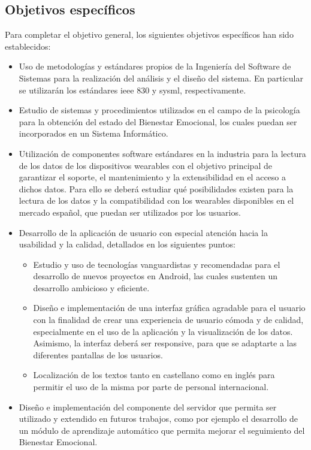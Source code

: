     \subsection{Objetivos específicos}
        Para completar el objetivo general, los siguientes objetivos específicos han sido establecidos:
        \begin{itemize}
            \item Uso de metodologías y estándares propios de la Ingeniería del Software de Sistemas para la realización del análisis y el diseño del sistema. En particular se utilizarán los estándares \gls{ieee} 830 y \gls{sysml}, respectivamente.
            \item Estudio de sistemas y procedimientos utilizados en el campo de la psicología para la obtención del estado del Bienestar Emocional, los cuales puedan ser incorporados en un Sistema Informático.
            \item Utilización de componentes software estándares en la industria para la lectura de los datos de los dispositivos \glspl{wearable} con el objetivo principal de garantizar el soporte, el mantenimiento y la extensibilidad en el acceso a dichos datos. Para ello se deberá estudiar qué posibilidades existen para la lectura de los datos y la compatibilidad con los \glspl{wearable} disponibles en el mercado español, que puedan ser utilizados por los usuarios.
            \item Desarrollo de la aplicación de usuario con especial atención hacia la usabilidad y la calidad, detallados en los siguientes puntos:
            \begin{itemize}
                \item Estudio y uso de tecnologías vanguardistas y recomendadas para el desarrollo de nuevos proyectos en Android, las cuales sustenten un desarrollo ambicioso y eficiente.
                \item Diseño e implementación de una interfaz gráfica agradable para el usuario con la finalidad de crear una experiencia de usuario cómoda y de calidad, especialmente en el uso de la aplicación y la visualización de los datos. Asimismo, la interfaz deberá ser \gls{responsive}, para que se adaptarte a las diferentes pantallas de los usuarios.
                \item Localización de los textos tanto en castellano como en inglés para permitir el uso de la misma por parte de personal internacional.
            \end{itemize}
            \item Diseño e implementación del componente del servidor que permita ser utilizado y extendido en futuros trabajos, como por ejemplo el desarrollo de un módulo de aprendizaje automático que permita mejorar el seguimiento del Bienestar Emocional.
        \end{itemize}


